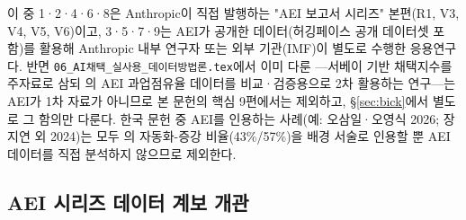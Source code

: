 \documentclass[11pt]{article}
\begin{document}
이 중 1·2·4·6·8은 Anthropic이 직접 발행하는 "AEI 보고서 시리즈" 본편(R1, V3, V4, V5, V6)이고, 3·5·7·9는 AEI가 공개한 데이터(허깅페이스 공개 데이터셋 포함)를 활용해 Anthropic 내부 연구자 또는 외부 기관(IMF)이 별도로 수행한 응용연구다. 반면 \texttt{06\_AI채택\_실사용\_데이터방법론.tex}에서 이미 다룬 \citet{bick-2026-what-work-does-generative}—서베이 기반 채택지수를 주자료로 삼되 \citet{handa-2025-which-economic-tasks-are}의 AEI 과업점유율 데이터를 비교·검증용으로 2차 활용하는 연구—는 AEI가 1차 자료가 아니므로 본 문헌의 핵심 9편에서는 제외하고, \S\ref{sec:bick}에서 별도로 그 함의만 다룬다. 한국 문헌 중 AEI를 인용하는 사례(예: 오삼일·오영식 2026; 장지연 외 2024)는 모두 \citet{handa-2025-which-economic-tasks-are}의 자동화-증강 비율(43\%/57\%)을 배경 서술로 인용할 뿐 AEI 데이터를 직접 분석하지 않으므로 제외한다.

\subsection{AEI 시리즈 데이터 계보 개관}
\end{document}

